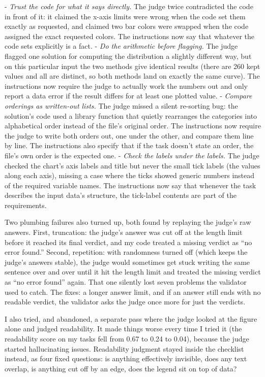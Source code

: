 \documentclass[11pt]{article}
\begin{document}
- \emph{Trust the code for what it says directly.} The judge twice contradicted the code in front of it: it claimed the x-axis limits were wrong when the code set them exactly as requested, and claimed two bar colors were swapped when the code assigned the exact requested colors. The instructions now say that whatever the code sets explicitly is a fact.
- \emph{Do the arithmetic before flagging.} The judge flagged one solution for computing the distribution a slightly different way, but on this particular input the two methods give identical results (there are 260 kept values and all are distinct, so both methods land on exactly the same curve). The instructions now require the judge to actually work the numbers out and only report a data error if the result differs for at least one plotted value.
- \emph{Compare orderings as written-out lists.} The judge missed a silent re-sorting bug: the solution's code used a library function that quietly rearranges the categories into alphabetical order instead of the file's original order. The instructions now require the judge to write both orders out, one under the other, and compare them line by line. The instructions also specify that if the task doesn't state an order, the file's own order is the expected one.
- \emph{Check the labels under the labels.} The judge checked the chart's axis labels and title but never the small tick labels (the values along each axis), missing a case where the ticks showed generic numbers instead of the required variable names. The instructions now say that whenever the task describes the input data's structure, the tick-label contents are part of the requirements.

Two plumbing failures also turned up, both found by replaying the judge's raw answers. First, truncation: the judge's answer was cut off at the length limit before it reached its final verdict, and my code treated a missing verdict as ``no error found.'' Second, repetition: with randomness turned off (which keeps the judge's answers stable), the judge would sometimes get stuck writing the same sentence over and over until it hit the length limit and treated the missing verdict as ``no error found'' again. That one silently lost seven problems the validator used to catch. The fixes: a longer answer limit, and if an answer still ends with no readable verdict, the validator asks the judge once more for just the verdicts.

I also tried, and abandoned, a separate pass where the judge looked at the figure alone and judged readability. It made things worse every time I tried it (the readability score on my tasks fell from 0.67 to 0.24 to 0.04), because the judge started hallucinating issues. Readability judgment stayed inside the checklist instead, as four fixed questions: is anything effectively invisible, does any text overlap, is anything cut off by an edge, does the legend sit on top of data?
\end{document}
